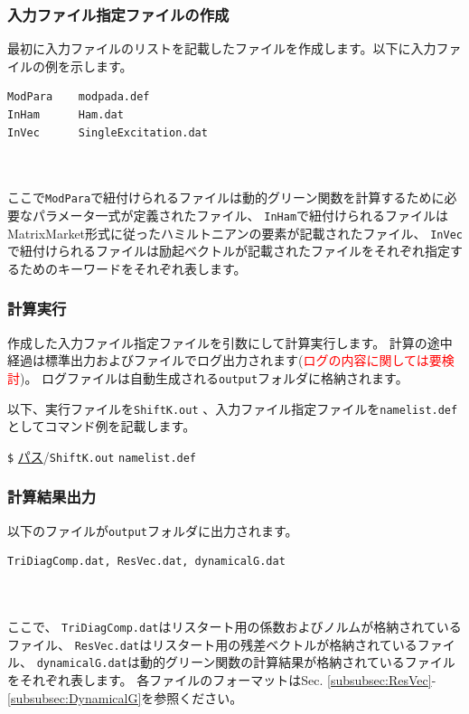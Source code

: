 \documentclass[12pt,titlepage]{jarticle}
\begin{document}
\subsubsection*{入力ファイル指定ファイルの作成}
最初に入力ファイルのリストを記載したファイルを作成します。以下に入力ファイルの例を示します。\\
\begin{minipage}{10cm}
\begin{screen}
\begin{verbatim}
ModPara    modpada.def
InHam      Ham.dat
InVec      SingleExcitation.dat
\end{verbatim}
\end{screen}
\end{minipage}
\\\\
ここで\verb|ModPara|で紐付けられるファイルは動的グリーン関数を計算するために必要なパラメータ一式が定義されたファイル、
\verb|InHam|で紐付けられるファイルはMatrixMarket形式に従ったハミルトニアンの要素が記載されたファイル、
\verb|InVec|で紐付けられるファイルは励起ベクトルが記載されたファイルをそれぞれ指定するためのキーワードをそれぞれ表します。

\subsubsection*{計算実行}
作成した入力ファイル指定ファイルを引数にして計算実行します。
計算の途中経過は標準出力およびファイルでログ出力されます(\textcolor{red}{ログの内容に関しては要検討})。
ログファイルは自動生成される\verb|output|フォルダに格納されます。

以下、実行ファイルを\verb|ShiftK.out| 、入力ファイル指定ファイルを\verb|namelist.def|としてコマンド例を記載します。

\verb|$| \underline{パス}/\verb|ShiftK.out|  \verb|namelist.def|

\subsubsection*{計算結果出力}
以下のファイルが\verb|output|フォルダに出力されます。
\\
\begin{minipage}{11cm}
\begin{screen}
\begin{verbatim}
TriDiagComp.dat, ResVec.dat, dynamicalG.dat
\end{verbatim}
\end{screen}
\end{minipage}
\\ \\
ここで、
\verb|TriDiagComp.dat|はリスタート用の係数およびノルムが格納されているファイル、
\verb|ResVec.dat|はリスタート用の残差ベクトルが格納されているファイル、
\verb|dynamicalG.dat|は動的グリーン関数の計算結果が格納されているファイルをそれぞれ表します。
各ファイルのフォーマットはSec. \ref{subsubsec:ResVec}-\ref{subsubsec:DynamicalG}を参照ください。
\end{document}
